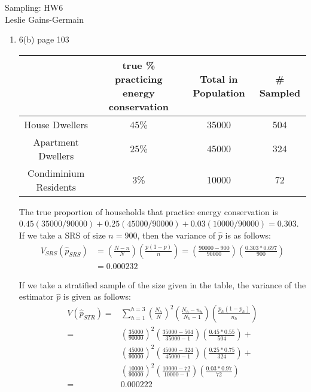 \documentclass[12pt]{article}\usepackage[]{graphicx}\usepackage[]{color}
\begin{document}
  
  
  \begin{center}
\large{Sampling: HW6} \\
Leslie Gains-Germain
\end{center}

\begin{doublespacing}

\begin{enumerate}

\item 6(b) page 103
\begin{table}[H]
\begin{tabular}{c|c|c|c}
& true \% practicing energy conservation & Total in Population & \# Sampled \\
\hline
House Dwellers & 45\% & 35000 & 504 \\
Apartment Dwellers & 25\% & 45000 & 324 \\
Condiminium Residents & 3\% & 10000 & 72 \\
\hline
\end{tabular}
\end{table}

The true proportion of households that practice energy conservation is $0.45(35000/90000)+0.25(45000/90000)+0.03(10000/90000) = 0.303$. If we take a SRS of size $n=900$, then the variance of $\hat{p}$ is as follows:
\begin{align*}
V_{SRS}(\hat{p}_{SRS}) &= \left(\frac{N-n}{N}\right) \left(\frac{p(1-p)}{n}\right) = \left(\frac{90000-900}{90000}\right) \left(\frac{0.303*0.697}{900}\right) \\
&= 0.000232
\end{align*}




If we take a stratified sample of the size given in the table, the variance of the estimator $\hat{p}$ is given as follows:
\begin{align*}
V(\hat{p}_{STR}) = &\sum_{h=1}^{h=3} \left(\frac{N_h}{N}\right)^2 \left(\frac{N_h-n_h}{N_h-1}\right) \left(\frac{p_h(1-p_h)}{n_h}\right) \\
= &\left(\frac{35000}{90000}\right)^2\left(\frac{35000-504}{35000-1}\right)\left(\frac{0.45*0.55}{504}\right) + \\
&\left(\frac{45000}{90000}\right)^2\left(\frac{45000-324}{45000-1}\right)\left(\frac{0.25*0.75}{324}\right) + \\
&\left(\frac{10000}{90000}\right)^2\left(\frac{10000-72}{10000-1}\right)\left(\frac{0.03*0.97}{72}\right) \\
= &0.000222
\end{align*}


\end{enumerate}
\end{doublespacing}
\end{document}
